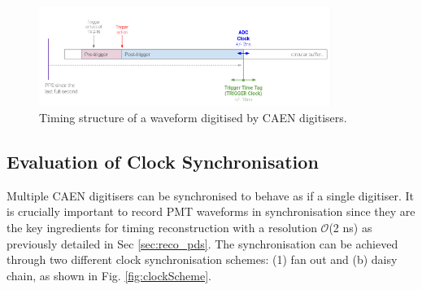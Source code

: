 \begin{figure}[t!] 
\centering    
\includegraphics[width=0.85\textwidth]{TTT_diagram}
\caption[Waveform Digitised By CAEN Timing Structure]{
Timing structure of a waveform digitised by CAEN digitisers.
}

\label{fig:TTTDiagram}
\end{figure}

\subsection{Evaluation of Clock Synchronisation}
\label{subsec42PMT}

Multiple CAEN digitisers can be synchronised to behave as if a single digitiser.
It is crucially important to record PMT waveforms in synchronisation since they are the key ingredients for timing reconstruction with a resolution $\mathcal{O}$(2 ns) as previously detailed in Sec \ref{sec:reco_pds}.
The synchronisation can be achieved through two different clock synchronisation schemes: (1) fan out and (b) daisy chain, as shown in Fig. \ref{fig:clockScheme}.

